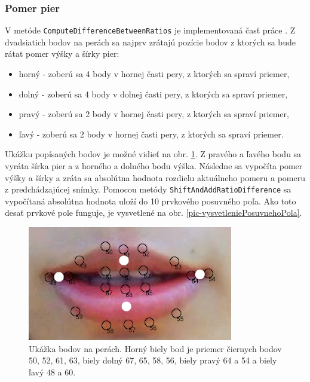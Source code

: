 \subsubsection{Pomer pier}\label{pomerPier}
V metóde \texttt{ComputeDifferenceBetweenRatios} je implementovaná časť práce \cite{aoki2007voice}.
Z dvadsiatich bodov na perách sa najprv zrátajú pozície bodov z ktorých sa bude rátat pomer výšky a šírky pier:
\begin{itemize}
\item horný - zoberú sa 4 body v hornej časti pery, z ktorých sa spraví priemer,
\item dolný - zoberú sa 4 body v dolnej časti pery, z ktorých sa spraví priemer,
\item pravý - zoberú sa 2 body v hornej časti pery, z ktorých sa spraví priemer,
\item ľavý - zoberú sa 2 body v hornej časti pery, z ktorých sa spraví priemer.
\end{itemize} 
Ukážku popísaných bodov je možné vidieť na obr. \ref{pic-bodyPomeru}.
Z pravého a ľavého bodu sa vyráta šírka pier a z horného a dolného bodu výška.
Následne sa vypočíta pomer výšky a šírky a zráta sa absolútna hodnota rozdielu aktuálneho pomeru a pomeru z predchádzajúcej snímky. 
Pomocou metódy \texttt{ShiftAndAddRatioDifference} sa vypočítaná absolútna hodnota uloží do 10 prvkového posuvného poľa.
Ako toto desať prvkové pole funguje, je vysvetlené na obr. \ref{pic-vysvetleniePosuvnehoPola}.

\begin{figure}[H]
	\begin{center}
		\includegraphics[height=5cm]{pics/peryBodyUpravene.png}
		\caption{Ukážka bodov na perách. Horný biely bod je priemer čiernych bodov 50, 52, 61, 63, biely dolný 67, 65, 58, 56, biely pravý 64 a 54 a biely ľavý 48 a 60.}
		\label{pic-bodyPomeru}
	\end{center}
\end{figure}

